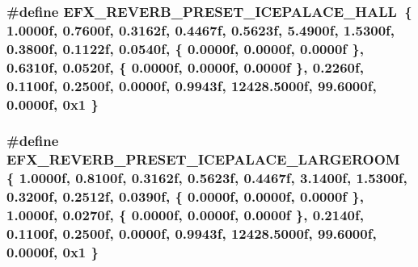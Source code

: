 \subsubsection[{\texorpdfstring{E\+F\+X\+\_\+\+R\+E\+V\+E\+R\+B\+\_\+\+P\+R\+E\+S\+E\+T\+\_\+\+I\+C\+E\+P\+A\+L\+A\+C\+E\+\_\+\+H\+A\+LL}{EFX_REVERB_PRESET_ICEPALACE_HALL}}]{\setlength{\rightskip}{0pt plus 5cm}\#define E\+F\+X\+\_\+\+R\+E\+V\+E\+R\+B\+\_\+\+P\+R\+E\+S\+E\+T\+\_\+\+I\+C\+E\+P\+A\+L\+A\+C\+E\+\_\+\+H\+A\+LL~\{ 1.\+0000f, 0.\+7600f, 0.\+3162f, 0.\+4467f, 0.\+5623f, 5.\+4900f, 1.\+5300f, 0.\+3800f, 0.\+1122f, 0.\+0540f, \{ 0.\+0000f, 0.\+0000f, 0.\+0000f \}, 0.\+6310f, 0.\+0520f, \{ 0.\+0000f, 0.\+0000f, 0.\+0000f \}, 0.\+2260f, 0.\+1100f, 0.\+2500f, 0.\+0000f, 0.\+9943f, 12428.\+5000f, 99.\+6000f, 0.\+0000f, 0x1 \}}\hypertarget{efx-presets_8h_aa9cd072f8d0b155aba5a3fbeb11acfc4}{}\label{efx-presets_8h_aa9cd072f8d0b155aba5a3fbeb11acfc4}
\subsubsection[{\texorpdfstring{E\+F\+X\+\_\+\+R\+E\+V\+E\+R\+B\+\_\+\+P\+R\+E\+S\+E\+T\+\_\+\+I\+C\+E\+P\+A\+L\+A\+C\+E\+\_\+\+L\+A\+R\+G\+E\+R\+O\+OM}{EFX_REVERB_PRESET_ICEPALACE_LARGEROOM}}]{\setlength{\rightskip}{0pt plus 5cm}\#define E\+F\+X\+\_\+\+R\+E\+V\+E\+R\+B\+\_\+\+P\+R\+E\+S\+E\+T\+\_\+\+I\+C\+E\+P\+A\+L\+A\+C\+E\+\_\+\+L\+A\+R\+G\+E\+R\+O\+OM~\{ 1.\+0000f, 0.\+8100f, 0.\+3162f, 0.\+5623f, 0.\+4467f, 3.\+1400f, 1.\+5300f, 0.\+3200f, 0.\+2512f, 0.\+0390f, \{ 0.\+0000f, 0.\+0000f, 0.\+0000f \}, 1.\+0000f, 0.\+0270f, \{ 0.\+0000f, 0.\+0000f, 0.\+0000f \}, 0.\+2140f, 0.\+1100f, 0.\+2500f, 0.\+0000f, 0.\+9943f, 12428.\+5000f, 99.\+6000f, 0.\+0000f, 0x1 \}}\hypertarget{efx-presets_8h_a0d680e53a7ff44ba5ec86768e065f2d0}{}\label{efx-presets_8h_a0d680e53a7ff44ba5ec86768e065f2d0}
